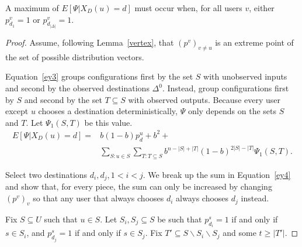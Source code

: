 \documentclass[prodmode,acmtissec]{acmsmall}
\begin{document}
\begin{lemma} \label{ef}
A maximum of $E[\Psi | X_D(u)=d]$ must occur when, for all users $v$, either $p^v_{d_1}=1$ or $p^v_{d_{|\Delta|}}=1$.
\end{lemma}
\begin{proof}
Assume, following Lemma~\ref{vertex}, that $(p^v)_{v\neq u}$ is an extreme point of the set of possible distribution vectors.

Equation~\ref{ey3} groups configurations first by the set $S$ with unobserved inputs and second by the observed destinations $\Delta^0$.  Instead, group configurations first by $S$ and second by the set $T\subseteq S$ with observed outputs.  Because every user except $u$ chooses a destination deterministically, $\Psi$ only depends on the sets $S$ and $T$.  Let $\Psi_1(S,T)$ be this value.
\begin{equation} \label{ey4}
  \begin{array}{ll}
  E[\Psi | X_D(u)=d] = &b(1-b)p^u_d + b^2 +\\
         & \sum_{S : u\in S} \sum_{T : T\subseteq S} b^{n-|S|+|T|}(1-b)^{2|S|-|T|} \Psi_1(S,T).
  \end{array}
\end{equation}

Select two destinations $d_i,d_j, 1<i<j$.  We break up the sum in Equation~\ref{ey4} and show that, for every piece, the sum can only be increased by changing $(p^v)_v$ so that any user that always chooses $d_i$ always chooses $d_j$ instead.

Fix $S\subseteq U$ such that $u\in S$.  Let $S_i, S_j\subseteq S$ be such that $p^s_{d_i}=1$ if and only if $s\in S_i$, and $p^s_{d_j}=1$ if and only if $s\in S_j$.  Fix $T'\subseteq S\backslash S_i\backslash S_j$ and some $t\ge |T'|$.


\end{proof}
\end{document}
